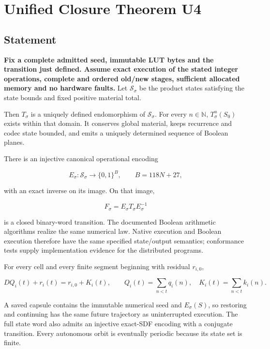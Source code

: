 \documentclass[11pt,a4paper]{article}
\begin{document}
\clearpage
\section{Unified Closure Theorem U4}\label{unified-closure-theorem-u4}

\subsection{Statement}\label{statement}

\textbf{Fix a complete admitted seed, immutable LUT bytes and the
transition just defined. Assume exact execution of the stated integer
operations, complete and ordered old/new stages, sufficient allocated
memory and no hardware faults.} Let \(\mathcal S_\sigma\) be the product
states satisfying the state bounds and fixed positive material total.

Then \(T_\sigma\) is a uniquely defined endomorphism of
\(\mathcal S_\sigma\). For every \(n\in\mathbb N\), \(T_\sigma^n(S_0)\)
exists within that domain. It conserves global material, keeps
recurrence and codec state bounded, and emits a uniquely determined
sequence of Boolean planes.

There is an injective canonical operational encoding

\[
E_\sigma:\mathcal S_\sigma\longrightarrow\{0,1\}^{B},
\qquad B=118N+27,
\]

with an exact inverse on its image. On that image,

\[
F_\sigma=E_\sigma T_\sigma E_\sigma^{-1}
\]

is a closed binary-word transition. The documented Boolean arithmetic
algorithms realize the same numerical law. Native execution and Boolean
execution therefore have the same specified state/output semantics;
conformance tests supply implementation evidence for the distributed
programs.

For every cell and every finite segment beginning with residual
\(r_{i,0}\),

\[
\boxed{D Q_i(t)+r_i(t)=r_{i,0}+K_i(t),}
\qquad
Q_i(t)=\sum_{n<t}q_i(n),\quad K_i(t)=\sum_{n<t}k_i(n).
\]

A saved capsule contains the immutable numerical seed and
\(E_\sigma(S)\), so restoring and continuing has the same future
trajectory as uninterrupted execution. The full state word also admits
an injective exact-SDF encoding with a conjugate transition. Every
autonomous orbit is eventually periodic because its state set is finite.
\end{document}
